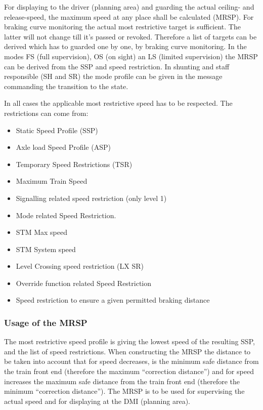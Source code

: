 For displaying to the driver (planning area) and guarding the actual ceiling- and release-speed, the maximum speed at any place shall be calculated (MRSP). For braking curve monitoring the actual most restrictive target is sufficient. The latter will not change till it's passed or revoked. Therefore a list of targets can be derived which has to guarded one by one, by braking curve monitoring.
In the modes FS (full supervision), OS (on sight) an LS (limited supervision) the MRSP can be derived from the SSP and speed restriction. In shunting and staff responsible (SH and SR) the mode profile can be given in the message commanding the transition to the state. 

In all cases the applicable most restrictive speed has to be respected. The restrictions can come from:
\begin{itemize}
\item Static Speed Profile (SSP)
\item Axle load Speed Profile (ASP)
\item Temporary Speed Restrictions (TSR)
\item Maximum Train Speed
\item Signalling related speed restriction (only level 1)
\item Mode related Speed Restriction.
\item STM Max speed
\item STM System speed
\item Level Crossing speed restriction (LX SR)
\item Override function related Speed Restriction
\item Speed restriction to ensure a given permitted braking distance 
\end{itemize}

\subsubsection{Usage of the MRSP}
The most restrictive speed profile is giving the lowest speed of the resulting SSP, and the list of speed restrictions.  When constructing the MRSP the distance to be taken into account that for speed decreases, is the minimum safe distance from the train front end (therefore the maximum “correction distance”) and for speed increases the maximum safe distance from the train front end (therefore the minimum “correction distance”).  The MRSP is to be used for supervising the actual speed and for displaying at the DMI (planning area). 

